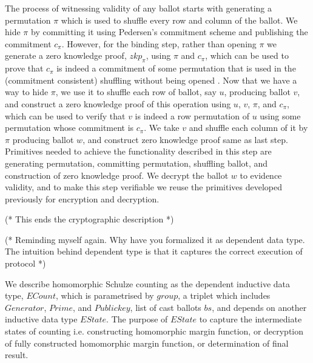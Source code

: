 \documentclass{llncs}
\begin{document}
The process of witnessing validity of any ballot starts with generating a 
permutation $\pi$ which is used to shuffle every row and column of the ballot.
We hide $\pi$ by committing it using Pedersen's 
commitment scheme 
and publishing  the commitment $c_{\pi}$. However, for the binding step, rather 
than opening $\pi$ we generate a zero knowledge proof, $zkp_{\pi}$, 
using $\pi$ and $c_{\pi}$, which can 
be  used to prove that $c_{\pi}$ is indeed a commitment of some permutation
that is used in the (commitment consistent) shuffling 
 without being opened \cite{Wikstrom:2009:CPS}. Now that we have a way 
 to hide $\pi$, we use it to shuffle each row of 
ballot, say $u$, producing ballot $v$, and construct a zero knowledge proof 
of this operation using $u$, $v$, $\pi$, and $c_{\pi}$, which can be used 
to verify that $v$ is indeed a row permutation of $u$ using some permutation 
whose commitment is $c_{\pi}$. We take $v$ and shuffle each column of it 
by $\pi$ producing ballot $w$, and construct zero knowledge proof same 
as last step.   
Primitives needed to achieve the functionality described in this step  
are generating permutation, committing permutation,  shuffling ballot, 
and construction of zero knowledge proof.
We decrypt the ballot $w$ to evidence validity, and to make this step
 verifiable we reuse the primitives developed previously for
 encryption and decryption.

(* This ends the cryptographic description *)

 
 
(* Reminding myself again. Why have you formalized it as dependent data type. 
   The intuition behind dependent type is that it captures the 
   correct execution of protocol *)

We describe homomorphic Schulze counting as the dependent inductive data 
type, $ECount$, which is parametrised by $group$, a triplet which includes
 $Generator$, $Prime$, and $Public key$, list of cast ballots $bs$, and depends on another inductive data type $EState$. 
The purpose of $EState$ to capture the intermediate states 
of counting i.e. constructing homomorphic margin function, or 
decryption of fully constructed homomorphic margin function, or 
determination of final result. 

\end{document}
